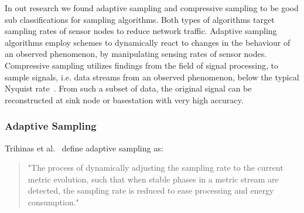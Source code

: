 In out research we found adaptive sampling and compressive sampling to be good
sub classifications for sampling algorithms. Both types of algorithms target
sampling rates of sensor nodes to reduce network traffic. Adaptive sampling
algorithms employ schemes to dynamically react to changes in the behaviour of
an observed phenomenon, by manipulating sensing rates of sensor nodes.
Compressive sampling utilizes findings from the field of signal processing, to
sample signals, i.e. data streams from an observed phenomenon, below the
typical Nyquist rate~\cite{candes2008introduction}. From such a subset of data,
the original signal can be reconstructed at sink node or basestation with very
high accuracy.

\subsubsection{Adaptive Sampling}
\label{sec:Adaptive Sampling}

Trihinas et al.~\cite{trihinas2015adam} define adaptive sampling as:

\begin{quote}
    "The process of dynamically adjusting the sampling rate to the current
    metric evolution, such that when stable phases in a metric stream are
    detected, the sampling rate is reduced to ease processing and energy
    consumption."
\end{quote}


